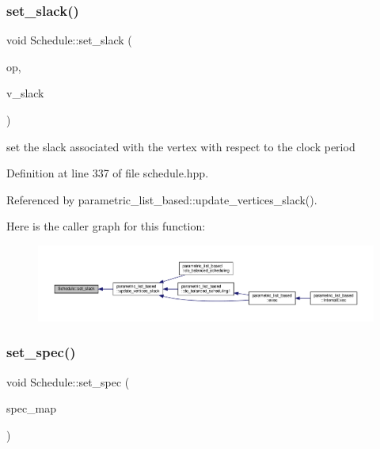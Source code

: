 \subsubsection{\texorpdfstring{set\+\_\+slack()}{set\_slack()}}
{\footnotesize\ttfamily void Schedule\+::set\+\_\+slack (\begin{DoxyParamCaption}\item[{\hyperlink{graph_8hpp_abefdcf0544e601805af44eca032cca14}{vertex}}]{op,  }\item[{double}]{v\+\_\+slack }\end{DoxyParamCaption})\hspace{0.3cm}{\ttfamily [inline]}}



set the slack associated with the vertex with respect to the clock period 



Definition at line 337 of file schedule.\+hpp.



Referenced by parametric\+\_\+list\+\_\+based\+::update\+\_\+vertices\+\_\+slack().

Here is the caller graph for this function\+:
\nopagebreak
\begin{figure}[H]
\begin{center}
\leavevmode
\includegraphics[width=350pt]{df/d61/classSchedule_af9a710c306cf7d06428bc10da109d4ee_icgraph}
\end{center}
\end{figure}
\mbox{\label{classSchedule_ab6c18b64a2d8e511b1aac306c439978a}} 
\subsubsection{\texorpdfstring{set\+\_\+spec()}{set\_spec()}}
{\footnotesize\ttfamily void Schedule\+::set\+\_\+spec (\begin{DoxyParamCaption}\item[{const \hyperlink{custom__map_8hpp_ad1ed68f2ff093683ab1a33522b144adc}{Custom\+Unordered\+Map}$<$ \hyperlink{graph_8hpp_abefdcf0544e601805af44eca032cca14}{vertex}, bool $>$ \&}]{spec\+\_\+map }\end{DoxyParamCaption})\hspace{0.3cm}{\ttfamily [inline]}}



